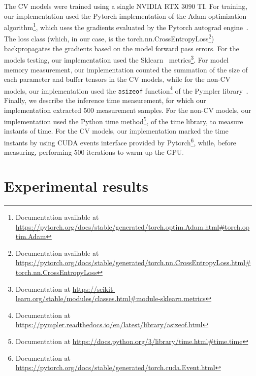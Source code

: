The \gls{CV} models were trained using a single NVIDIA RTX 3090 TI. For training, our implementation used the Pytorch implementation of the Adam optimization algorithm\footnote{Documentation available at \url{https://pytorch.org/docs/stable/generated/torch.optim.Adam.html\#torch.optim.Adam}}, which uses the gradients evaluated by the Pytorch autograd engine~\cite{Pytorch}. The loss class (which, in our case, is the torch.nn.CrossEntropyLoss\footnote{Documentation available at \url{https://pytorch.org/docs/stable/generated/torch.nn.CrossEntropyLoss.html\#torch.nn.CrossEntropyLoss}}) backpropagates the gradients based on the model forward pass errors. For the models testing, our implementation used the Sklearn~\cite{Sklearn} metrics\footnote{Documentation at \url{https://scikit-learn.org/stable/modules/classes.html\#module-sklearn.metrics}}. For model memory measurement, our implementation counted the summation of the size of each parameter and buffer tensors in the \gls{CV} models, while for the non-\gls{CV} models, our implementation used the \texttt{asizeof} function\footnote{Documentation at \url{https://pympler.readthedocs.io/en/latest/library/asizeof.html}} of the Pympler library~\cite{Pympler}. Finally, we describe the inference time measurement, for which our implementation extracted 500 measurement samples. For the non-\gls{CV} models, our implementation used the Python time method\footnote{Documentation at \url{https://docs.python.org/3/library/time.html\#time.time}}, of the time library, to measure instants of time. For the \gls{CV} models, our implementation marked the time instants by using CUDA events interface provided by Pytorch\footnote{Documentation at \url{https://pytorch.org/docs/stable/generated/torch.cuda.Event.html}}, while, before measuring, performing 500 iterations to warm-up the GPU. 

\section{Experimental results}

